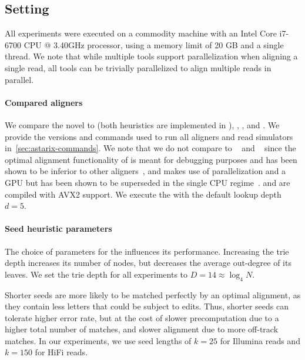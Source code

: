 \subsection{Setting}
%
All experiments were executed on a commodity machine with an Intel Core i7-6700
CPU @ 3.40GHz processor, using a memory limit of 20 GB and a single thread.
%
We note that while multiple tools support parallelization when aligning a single
read, all tools can be trivially parallelized to align multiple reads in
parallel.

\paragraph{Compared aligners}
%
We compare the novel \seedh to \prefixh (both heuristics are implemented in
\astarix), \graphaligner, \pasgal, and \vargas. We provide the versions and
commands used to run all aligners and read simulators
in~\cref{sec:astarix-commands}. 
%
We note that we do not compare to \vg~\citep{garrison_variation_2018} and
\hga~\citep{feng2021accelerating} since the optimal alignment functionality of
\vg is meant for debugging purposes and has been shown to be inferior to other
aligners~\citep[Tab.~4]{feng2021accelerating}, and \hga makes use of
parallelization and a GPU but has been shown to be superseded in the single CPU
regime~\citep[Fig.~9]{feng2021accelerating}. \pasgal and \vargas are compiled
with AVX2 support. We execute the \prefixh with the default lookup depth $d=5$.

\paragraph{Seed heuristic parameters}
%
The choice of parameters for the \seedh influences its performance.
%
Increasing the trie depth increases its number of nodes, but decreases the
average out-degree of its leaves. We set the trie depth for all experiments to
$D=14 \approx \log_4 N$.

Shorter seeds are more likely to be matched perfectly by an optimal alignment,
as they contain less letters that could be subject to edits. Thus, shorter seeds
can tolerate higher error rate, but at the cost of slower precomputation due to
a higher total number of matches, and slower alignment due to more off-track
matches.
%
In our experiments, we use seed lengths of $k=25$ for Illumina reads and $k=150$
for HiFi reads.

